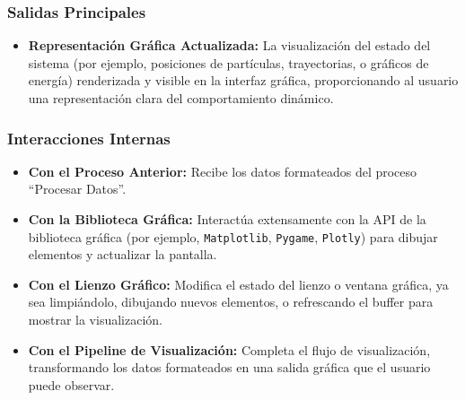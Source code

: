 \subsubsection{Salidas Principales}
\begin{itemize}
    \item \textbf{Representación Gráfica Actualizada:}
    La visualización del estado del sistema (por ejemplo, posiciones de partículas, trayectorias, o gráficos de energía) renderizada y visible en la interfaz gráfica, proporcionando al usuario una representación clara del comportamiento dinámico.
\end{itemize}

\subsubsection{Interacciones Internas}
\begin{itemize}
    \item \textbf{Con el Proceso Anterior:}
    Recibe los datos formateados del proceso ``Procesar Datos''.
    \item \textbf{Con la Biblioteca Gráfica:}
    Interactúa extensamente con la API de la biblioteca gráfica (por ejemplo, \texttt{Matplotlib}, \texttt{Pygame}, \texttt{Plotly}) para dibujar elementos y actualizar la pantalla.
    \item \textbf{Con el Lienzo Gráfico:}
    Modifica el estado del lienzo o ventana gráfica, ya sea limpiándolo, dibujando nuevos elementos, o refrescando el buffer para mostrar la visualización.
    \item \textbf{Con el Pipeline de Visualización:}
    Completa el flujo de visualización, transformando los datos formateados en una salida gráfica que el usuario puede observar.
\end{itemize}
\newpage
